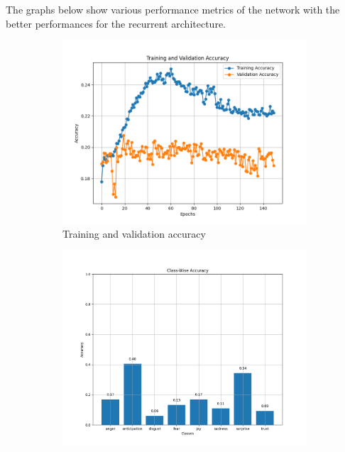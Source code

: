 

The graphs below show various performance metrics of the network with the better
performances for the recurrent architecture.
\begin{figure}[H]
    \centering
    \begin{subfigure}{0.48\textwidth}
        \includegraphics[width=\textwidth]{pictures/rnn_accuracy.png}
        \caption{Training and validation accuracy}
        \label{fig:rnn_train_val_acc}
    \end{subfigure}
    \begin{subfigure}{0.5\textwidth}
        \includegraphics[width=\textwidth]{pictures/rnn_class_accuracy.png}

\end{subfigure}
\end{figure}
